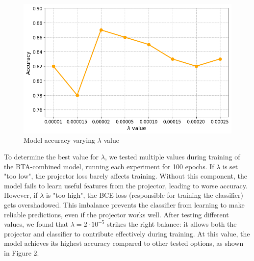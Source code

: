 \documentclass{article}
\begin{document}
\begin{figure}
    \centering
    \includegraphics[width=1\linewidth]{fig/BTA-combined_lambdas-accuracy.png}
    \caption{Model accuracy varying $\lambda$ value}
\end{figure}
To determine the best value for $\lambda$, we tested multiple values during training of the BTA-combined model, running each experiment for 100 epochs. If $\lambda$ is set "too low", the projector loss barely affects training. Without this component, the model fails to learn useful features from the projector, leading to worse accuracy. However, if $\lambda$ is "too high", the BCE loss (responsible for training the classifier) gets overshadowed. This imbalance prevents the classifier from learning to make reliable predictions, even if the projector works well. After testing different values, we found that $\lambda = 2 \cdot 10^{-5}$ strikes the right balance: it allows both the projector and classifier to contribute effectively during training. At this value, the model achieves its highest accuracy compared to other tested options, as shown in Figure 2.
\end{document}
